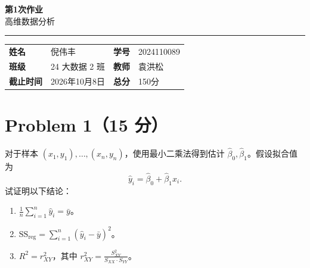 \documentclass[12pt,a4paper]{article}
\newcommand{\course}{高维数据分析}
\newcommand{\homeworktitle}{第1次作业}
\newcommand{\studentname}{倪伟丰}
\newcommand{\studentid}{2024110089}
\newcommand{\classname}{24 大数据 2 班}
\newcommand{\teacher}{袁洪松}
\newcommand{\duedate}{2026年10月8日}
\newcommand{\totalpoints}{150}
\begin{document}
\begin{center}
  {\Huge\bfseries\color{mainblue}\homeworktitle}\\[0.6em]
  {\Large\course}\\[1.2em]
  {\color{linegray}\rule{0.9\textwidth}{0.8pt}}
\end{center}

\begin{infobox}
\begin{tabularx}{\textwidth}{>{\bfseries}p{2.2cm} X >{\bfseries}p{2.2cm} X}
姓名 & \studentname & 学号 & \studentid \\
班级 & \classname & 教师 & \teacher \\
截止时间 & \duedate & 总分 & \totalpoints 分
\end{tabularx}
\end{infobox}


\section{Problem 1（15 分）}

对于样本 $(x_1,y_1),\ldots,(x_n,y_n)$，使用最小二乘法得到估计
$\hat{\beta}_0,\hat{\beta}_1$。假设拟合值为
\[
  \hat{y}_i=\hat{\beta}_0+\hat{\beta}_1x_i.
\]
试证明以下结论：
\begin{enumerate}[label=\arabic*., leftmargin=2em]
  \item $\displaystyle \frac{1}{n}\sum_{i=1}^{n}\hat{y}_i=\bar{y}$。
  \item $\displaystyle \mathrm{SS}_{\mathrm{reg}}
    =\sum_{i=1}^{n}(\hat{y}_i-\bar{y})^2$。
  \item $\displaystyle R^2=r_{XY}^2$，其中
    $\displaystyle r_{XY}^2=\frac{S_{XY}^2}{S_{XX}\cdot S_{YY}}$。
\end{enumerate}
\end{document}
